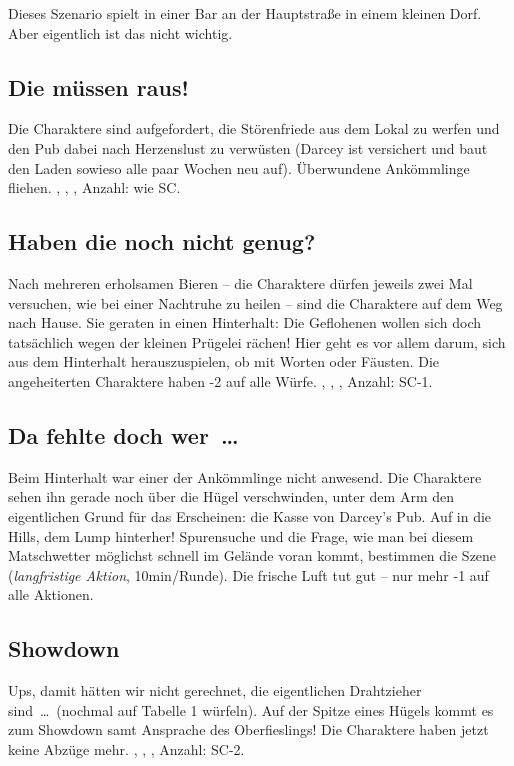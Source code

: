 {	

		\noindent
		Dieses Szenario spielt in einer Bar an der Hauptstraße in einem kleinen Dorf. Aber eigentlich ist das nicht wichtig.

		\subsection{Die müssen raus!}

		Die Charaktere sind aufgefordert, die Störenfriede aus dem Lokal zu werfen und den Pub dabei nach Herzenslust zu verwüsten (Darcey ist versichert und baut den Laden sowieso alle paar Wochen neu auf). Überwundene Ankömmlinge fliehen.  , , , Anzahl: wie SC.

		\subsection{Haben die noch nicht genug?}

		Nach mehreren erholsamen Bieren -- die Charaktere dürfen jeweils zwei Mal versuchen, wie bei einer Nachtruhe zu heilen -- sind die Charaktere auf dem Weg nach Hause. Sie geraten in einen Hinterhalt: Die Geflohenen wollen sich doch tatsächlich wegen der kleinen Prügelei rächen! Hier geht es vor allem darum, sich aus dem Hinterhalt herauszuspielen, ob mit Worten oder Fäusten. Die angeheiterten Charaktere haben -2 auf alle Würfe.  , , , Anzahl: SC-1.

		\subsection{Da fehlte doch wer~\ldots}

		Beim Hinterhalt war einer der Ankömmlinge nicht anwesend. Die Charaktere sehen ihn gerade noch über die Hügel verschwinden, unter dem Arm den eigentlichen Grund für das Erscheinen: die Kasse von Darcey’s Pub. Auf in die Hills, dem Lump hinterher! Spurensuche und die Frage, wie man bei diesem Matschwetter möglichst schnell im Gelände voran kommt, bestimmen die Szene (\emph{langfristige Aktion}, 10min/Runde). Die frische Luft tut gut -- nur mehr -1 auf alle Aktionen.

		\subsection{Showdown}

		Ups, damit hätten wir nicht gerechnet, die eigentlichen Drahtzieher sind~\ldots~(nochmal auf Tabelle 1 würfeln). Auf der Spitze eines Hügels kommt es zum Showdown samt Ansprache des Oberfieslings! Die Charaktere haben jetzt keine Abzüge mehr.  , , , Anzahl: SC-2.

}
